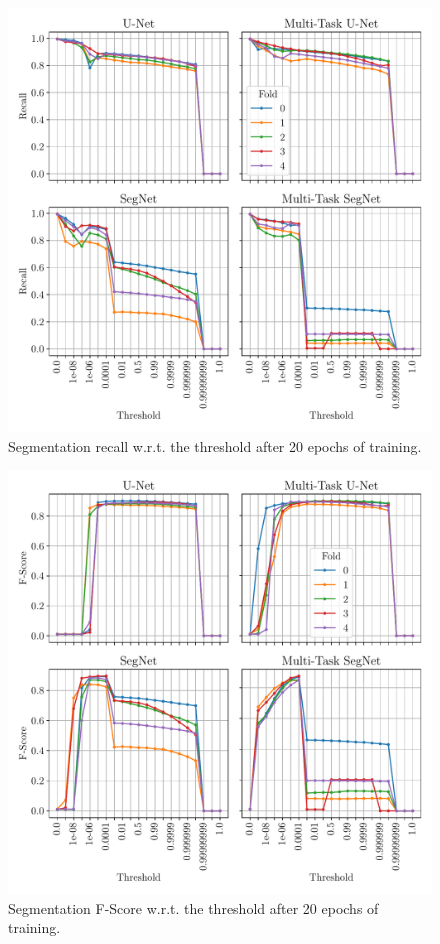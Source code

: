 \documentclass[twocolumn,superscriptaddress,aps,nofootinbib]{revtex4-1}
\begin{document}
\begin{figure}[h]
    \centering
    \includegraphics[width=\columnwidth]{resources/pdf/segmentation_r.pdf}
    \caption{Segmentation recall w.r.t. the threshold after 20 epochs of training.}
    \label{fig:segmentation_r}
\end{figure}

\begin{figure}[h]
    \centering
    \includegraphics[width=\columnwidth]{resources/pdf/segmentation_f.pdf}
    \caption{Segmentation F-Score w.r.t. the threshold after 20 epochs of training.}
    \label{fig:segmentation_f}
\end{figure}
\end{document}
